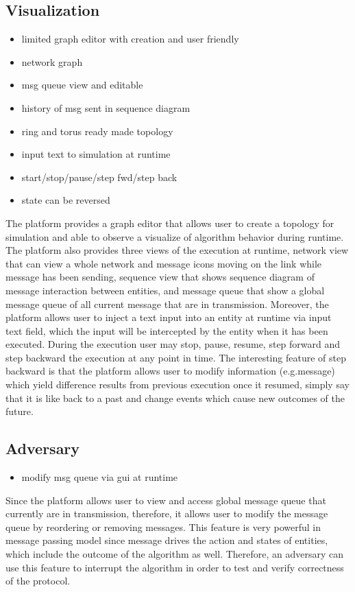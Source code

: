 \subsection*{Visualization}
\begin{itemize}
\item limited graph editor with creation and user friendly
\item network graph
\item msg queue view and editable
\item history of msg sent in sequence diagram
\item ring and torus ready made topology
\item input text to simulation at runtime
\item start/stop/pause/step fwd/step back
\item state can be reversed
\end{itemize}


The platform provides a graph editor that allows user to create a topology for simulation and able to observe a visualize of algorithm behavior during runtime. The platform also provides three views of the execution at runtime, network view that can view a whole network and message icons moving on the link while message has been sending, sequence view that shows sequence diagram of message interaction between entities, and message queue that show a global message queue of all current message that are in transmission. Moreover, the platform allows user to inject a text input into an entity at runtime via input text field, which the input will be intercepted by the entity when it has been executed. During the execution user may stop, pause, resume, step forward and step backward the execution at any point in time. The interesting feature of step backward is that the platform allows user to modify information (e.g.message) which yield difference results from previous execution once it resumed, simply say that it is like back to a past and change events which cause new outcomes of the future.

\subsection*{Adversary}
\begin{itemize}
\item modify msg queue via gui at runtime
\end{itemize}

Since the platform allows user to view and access global message queue that currently are in transmission, therefore, it allows user to modify the message queue by reordering or removing messages. This feature is very powerful in message passing model since message drives the action and states of entities, which include the outcome of the algorithm as well. Therefore, an adversary can use this feature to interrupt the algorithm in order to test and verify correctness of the protocol.

